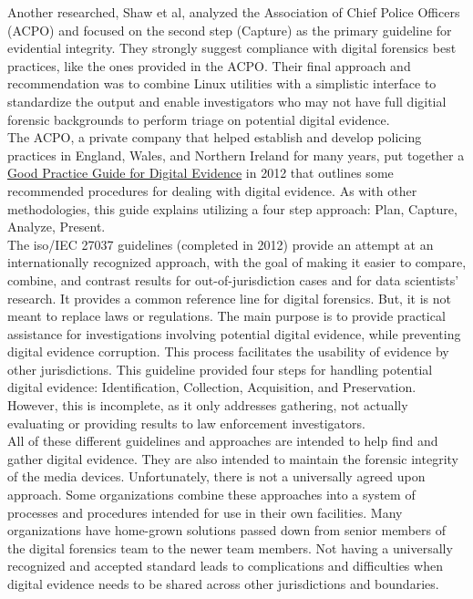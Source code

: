 \documentclass[12pt]{article}
\begin{document}
Another researched, Shaw et al, analyzed the Association of Chief Police Officers (ACPO)
and focused on the second step (Capture) as the primary guideline for evidential
integrity\cite{shaw2013practical}.  They strongly suggest compliance with
digital forensics best practices, like the ones provided in the ACPO.  Their final approach
and recommendation was to combine Linux utilities with a simplistic interface to standardize
the output and enable investigators who may not have full digitial forensic backgrounds
to perform triage on potential digital evidence.\\

The ACPO, a private company that helped establish and
develop policing practices in England, Wales, and Northern Ireland for many years,
put together a \uline{Good Practice Guide for Digital Evidence}\cite{williams2012acpo} in 2012 that outlines some
recommended procedures for dealing with digital evidence.  As with other methodologies, this guide
explains utilizing a four step approach: Plan, Capture, Analyze, Present.\\

The \gls{iso}/IEC 27037 guidelines (completed in 2012) provide an attempt at an internationally 
recognized approach,
with the goal of making it easier to compare, combine, and contrast
results for out-of-jurisdiction cases and for data scientists' research\cite{ISO27037}.  It provides a
common reference line for 
digital forensics\cite{ajijola2014review}.  But, it is not meant to replace laws or regulations.
The main purpose is to provide practical
assistance for investigations involving potential digital evidence, while preventing digital
evidence corruption.  This
process facilitates the usability of evidence by other jurisdictions.  This guideline provided
four steps for handling
potential digital evidence: Identification, Collection, Acquisition, and Preservation.  However,
this is incomplete, as
it only addresses gathering, not actually evaluating or providing results to law enforcement
investigators.\\

All of these different guidelines and approaches are intended to help find and gather digital evidence.
They are also intended to maintain the forensic integrity of the media devices.  Unfortunately, there 
is not a universally agreed upon approach. Some organizations combine these approaches
into a system of processes and procedures intended for use in their own facilities.  
Many organizations have home-grown solutions passed down from senior members of the digital forensics
team to the newer team members.  Not having a universally recognized and accepted standard 
leads to complications and difficulties when digital evidence needs to be shared across other
jurisdictions and boundaries\cite{ajijola2014review}.\\
\end{document}
